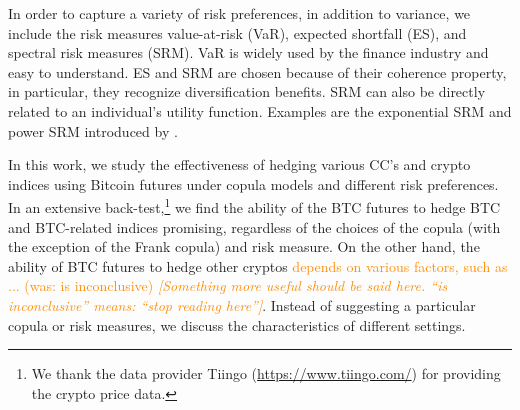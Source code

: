 \documentclass[11pt,a4paper,english]{article}
\providecommand{\natp}[1]{\textcolor{darkorange}{#1}}
\begin{document}
In order to capture a variety of risk preferences, in addition to
variance, we include the risk measures value-at-risk (VaR), expected
shortfall (ES), and spectral risk measures (SRM). 
VaR is widely used by the finance industry and easy to understand. 
ES and SRM are chosen because of their coherence property, in
particular, they recognize diversification benefits.
SRM can also be directly related to an individual's utility function.
Examples are the exponential SRM and power SRM introduced by
\citet{dowd2008spectral}. 

%

In this work, we study the effectiveness of hedging various CC's and
crypto indices using Bitcoin futures under copula models and different
risk preferences. 
In an extensive back-test,\footnote{We thank the data provider
  Tiingo (\href{https://www.tiingo.com/}{https://www.tiingo.com/}) for
  providing the crypto price data.}
 we find the ability of the BTC futures to hedge BTC and BTC-related
 indices promising, regardless of the choices of the copula (with the
 exception of the Frank copula) and risk measure. 
On the other hand, the ability of BTC futures to hedge other cryptos
\natp{depends on various factors, such as ... (was: is inconclusive)
  {\em [Something more useful should be said here. ``is inconclusive''
  means: ``stop reading here'']}}. 
Instead of suggesting a particular copula or risk measures, we discuss
the characteristics of different settings.  
\end{document}
